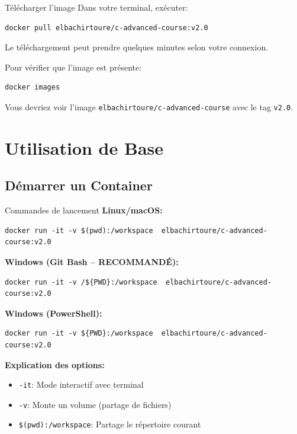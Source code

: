 \documentclass[10pt,a4paper]{article}
\begin{document}
\begin{exercicebox}{Télécharger l'image}
Dans votre terminal, exécuter:
\begin{verbatim}
docker pull elbachirtoure/c-advanced-course:v2.0
\end{verbatim}

Le téléchargement peut prendre quelques minutes selon votre connexion.

Pour vérifier que l'image est présente:
\begin{verbatim}
docker images
\end{verbatim}

Vous devriez voir l'image \texttt{elbachirtoure/c-advanced-course} avec le tag \texttt{v2.0}.
\end{exercicebox}

\section{Utilisation de Base}

\subsection{Démarrer un Container}

\begin{techbox}{Commandes de lancement}
\textbf{Linux/macOS:}
\begin{verbatim}
docker run -it -v $(pwd):/workspace  elbachirtoure/c-advanced-course:v2.0
\end{verbatim}

\textbf{Windows (Git Bash -- RECOMMANDÉ):}
\begin{verbatim}
docker run -it -v /${PWD}:/workspace  elbachirtoure/c-advanced-course:v2.0
\end{verbatim}

\textbf{Windows (PowerShell):}
\begin{verbatim}
docker run -it -v ${PWD}:/workspace  elbachirtoure/c-advanced-course:v2.0
\end{verbatim}

\textbf{Explication des options:}
\begin{itemize}
\item \texttt{-it}: Mode interactif avec terminal
\item \texttt{-v}: Monte un volume (partage de fichiers)
\item \texttt{\$(pwd):/workspace}: Partage le répertoire courant
\end{itemize}
\end{techbox}
\end{document}
